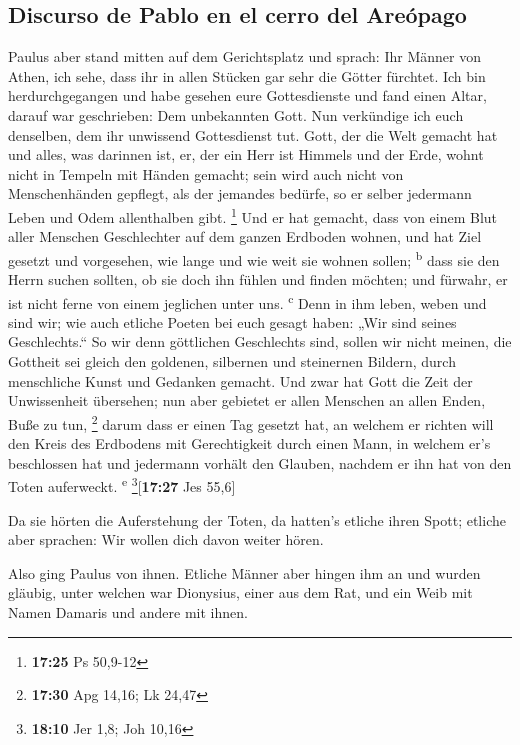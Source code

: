 \hypertarget{discurso-de-pablo-en-el-cerro-del-areuxf3pago}{%
\subsection{Discurso de Pablo en el cerro del
Areópago}\label{discurso-de-pablo-en-el-cerro-del-areuxf3pago}}

 Paulus aber stand mitten auf dem Gerichtsplatz und
sprach: Ihr Männer von Athen, ich sehe, dass ihr in allen Stücken gar
sehr die Götter fürchtet.  Ich bin herdurchgegangen und
habe gesehen eure Gottesdienste und fand einen Altar, darauf war
geschrieben: Dem unbekannten Gott. Nun verkündige ich euch denselben,
dem ihr unwissend Gottesdienst tut.  Gott, der die Welt
gemacht hat und alles, was darinnen ist, er, der ein Herr ist Himmels
und der Erde, wohnt nicht in Tempeln mit Händen gemacht; 
sein wird auch nicht von Menschenhänden gepflegt, als der jemandes
bedürfe, so er selber jedermann Leben und Odem allenthalben gibt.
\footnote{\textbf{17:25} Ps 50,9-12}  Und er hat gemacht,
dass von einem Blut aller Menschen Geschlechter auf dem ganzen Erdboden
wohnen, und hat Ziel gesetzt und vorgesehen, wie lange und wie weit sie
wohnen sollen; \textsuperscript{b}  dass sie den Herrn
suchen sollten, ob sie doch ihn fühlen und finden möchten; und fürwahr,
er ist nicht ferne von einem jeglichen unter uns. \textsuperscript{c}
 Denn in ihm leben, weben und sind wir; wie auch etliche
Poeten bei euch gesagt haben: „Wir sind seines Geschlechts.``
 So wir denn göttlichen Geschlechts sind, sollen wir
nicht meinen, die Gottheit sei gleich den goldenen, silbernen und
steinernen Bildern, durch menschliche Kunst und Gedanken gemacht.
 Und zwar hat Gott die Zeit der Unwissenheit übersehen;
nun aber gebietet er allen Menschen an allen Enden, Buße zu tun,
\footnote{\textbf{17:30} Apg 14,16; Lk 24,47}  darum dass
er einen Tag gesetzt hat, an welchem er richten will den Kreis des
Erdbodens mit Gerechtigkeit durch einen Mann, in welchem er's
beschlossen hat und jedermann vorhält den Glauben, nachdem er ihn hat
von den Toten auferweckt. \textsuperscript{e}
\footnote{\textbf{18:10} Jer 1,8; Joh 10,16}{[}\textbf{17:27} Jes
55,6{]}

 Da sie hörten die Auferstehung der Toten, da hatten's
etliche ihren Spott; etliche aber sprachen: Wir wollen dich davon weiter
hören.

 Also ging Paulus von ihnen.  Etliche
Männer aber hingen ihm an und wurden gläubig, unter welchen war
Dionysius, einer aus dem Rat, und ein Weib mit Namen Damaris und andere
mit ihnen.

